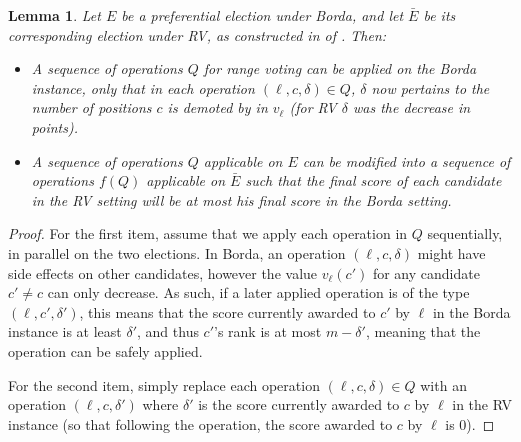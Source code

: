 \documentclass[letterpaper]{article} %
\newtheorem{lemma}{Lemma}
\begin{document}
\begin{lemma}\label{lem:corresponding}
Let $E$ be a preferential election under Borda, and let $\bar{E}$ be its corresponding election under RV, as constructed in  of . Then:
\begin{itemize}
    \item A sequence of operations $Q$ for range voting can be applied on the Borda instance, only that in each operation $(\ell, c, \delta) \in Q$, $\delta$ now pertains to the number of positions $c$ is demoted by in $v_\ell$ (for  RV $\delta$ was the decrease in points).
    \item A sequence of operations $Q$ applicable on $E$ can be modified into a sequence of operations $f(Q)$  applicable on $\bar{E}$ such that the final score of each candidate in the RV setting will be at most his final score in the Borda setting.
\end{itemize}
\end{lemma}
\begin{proof}
For the first item, assume that we apply each operation in $Q$ sequentially, in parallel on the two elections. In Borda, an operation $(\ell, c, \delta)$ might have side effects on other candidates, however the value $v_{\ell}(c')$ for any  candidate $c' \neq c$ can only decrease. As such, if a later applied operation is of the type $(\ell, c' ,\delta')$, this means that the score currently awarded to $c'$ by $\ell$ in the Borda instance is at least $\delta'$, and thus $c'$'s rank is at most $m-\delta'$, meaning that the operation can be safely applied.   

For the second item, simply replace each  operation $(\ell, c, \delta) \in Q$ with an operation $(\ell,c,\delta')$ where $\delta'$ is the score currently awarded to $c$ by $\ell$ in the RV instance (so that following the operation, the score  awarded to $c$ by $\ell$ is $0$).
\end{proof}
\end{document}
